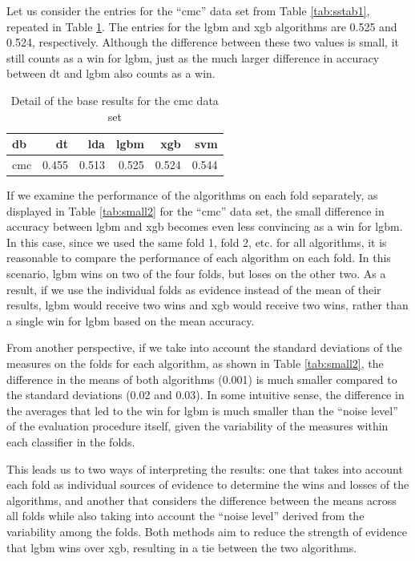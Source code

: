 \documentclass[twoside,11pt,preprint]{article}
\begin{document}
Let us consider the entries for the ``cmc'' data set from Table \ref{tab:sstab1}, repeated in Table \ref{tab:small1}. The entries for the lgbm and xgb algorithms are 0.525 and 0.524, respectively. Although the difference between these two values is small, it still counts as a win for lgbm, just as the much larger difference in accuracy between dt and lgbm also counts as a win.

\begin{table}

\caption{\label{tab:xsmall1}\label{tab:small1}Detail of the base results for the cmc data set}
\centering
\begin{tabular}[t]{lrrrrr}
\toprule
\textbf{db} & \textbf{dt} & \textbf{lda} & \textbf{lgbm} & \textbf{xgb} & \textbf{svm}\\
\midrule
cmc & 0.455 & 0.513 & 0.525 & 0.524 & 0.544\\
\bottomrule
\end{tabular}
\end{table}

If we examine the performance of the algorithms on each fold separately, as displayed in Table \ref{tab:small2} for the ``cmc'' data set, the small difference in accuracy between lgbm and xgb becomes even less convincing as a win for lgbm. In this case, since we used the same fold 1, fold 2, etc. for all algorithms, it is reasonable to compare the performance of each algorithm on each fold. In this scenario, lgbm wins on two of the four folds, but loses on the other two. As a result, if we use the individual folds as evidence instead of the mean of their results, lgbm would receive two wins and xgb would receive two wins, rather than a single win for lgbm based on the mean accuracy.

From another perspective, if we take into account the standard deviations of the measures on the folds for each algorithm, as shown in Table \ref{tab:small2}, the difference in the means of both algorithms (0.001) is much smaller compared to the standard deviations (0.02 and 0.03). In some intuitive sense, the difference in the averages that led to the win for lgbm is much smaller than the ``noise level'' of the evaluation procedure itself, given the variability of the measures within each classifier in the folds.

This leads us to two ways of interpreting the results: one that takes into account each fold as individual sources of evidence to determine the wins and losses of the algorithms, and another that considers the difference between the means across all folds while also taking into account the ``noise level'' derived from the variability among the folds. Both methods aim to reduce the strength of evidence that lgbm wins over xgb, resulting in a tie between the two algorithms.
\end{document}
